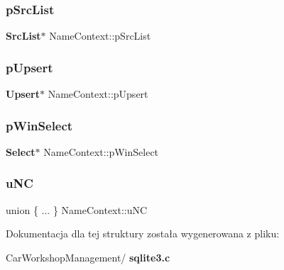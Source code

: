 \mbox{\label{struct_name_context_a6ede21da33e2e9bd3d0c5fe90a3ec72c}} 
\subsubsection{pSrcList}
{\footnotesize\ttfamily \textbf{ Src\+List}$\ast$ Name\+Context\+::p\+Src\+List}

\mbox{\label{struct_name_context_a961ee6a54129d42bbc25fb2a61e6d7ed}} 
\subsubsection{pUpsert}
{\footnotesize\ttfamily \textbf{ Upsert}$\ast$ Name\+Context\+::p\+Upsert}

\mbox{\label{struct_name_context_aaace250877e54c6e45c2699afb2b2869}} 
\subsubsection{pWinSelect}
{\footnotesize\ttfamily \textbf{ Select}$\ast$ Name\+Context\+::p\+Win\+Select}

\mbox{\label{struct_name_context_a5f4a8cb92956c10dd655f02fbec5146e}} 
\subsubsection{uNC}
{\footnotesize\ttfamily union \{ ... \}   Name\+Context\+::u\+NC}



Dokumentacja dla tej struktury została wygenerowana z pliku\+:\begin{DoxyCompactItemize}
\item 
Car\+Workshop\+Management/\textbf{ sqlite3.\+c}\end{DoxyCompactItemize}
